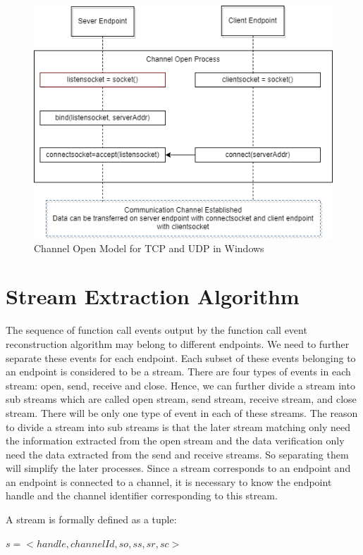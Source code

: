 \begin{figure}[H]
\centerline{\includegraphics[scale=0.6]{Figures/tcpudpchannelopen}}
 \caption{Channel Open Model for TCP and UDP in Windows}
\label{channelopen2}    
\end{figure}

\section{Stream Extraction Algorithm}
The sequence of function call events output by the function call event reconstruction algorithm may belong to different endpoints. We need to further separate these events for each endpoint. Each subset of these events belonging to an endpoint is considered to be a stream. There are four types of events in each stream: open, send, receive and close. Hence, we can further divide a stream into sub streams which are called open stream, send stream, receive stream, and close stream. There will be only one type of event in each of these streams. The reason to divide a stream into sub streams is that the later stream matching only need the information extracted from the open stream and the data verification only need the data extracted from the send and receive streams. So separating them will simplify the later processes. Since a stream corresponds to an endpoint and an endpoint is connected to a channel, it is necessary to know the endpoint handle and the channel identifier corresponding to this stream. 

A stream is formally defined as a tuple:

$s = <handle, channelId, so, ss, sr, sc>$

